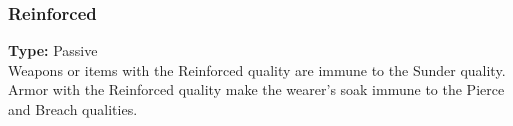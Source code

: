 \subsubsection{Reinforced}
\label{iqty:reinforced}
\textbf{Type:} Passive\\
Weapons or items with the Reinforced quality are
immune to the Sunder quality. Armor with the
Reinforced quality make the wearer's soak immune to
the Pierce and Breach qualities.
